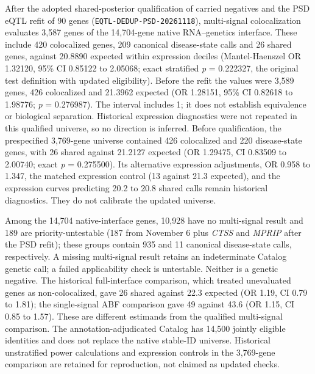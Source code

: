 After the adopted shared-posterior qualification of carried negatives and the PSD eQTL refit of 90 genes (\texttt{EQTL-DEDUP-PSD-20261118}), multi-signal colocalization evaluates 3,587 genes of the 14,704-gene native RNA--genetics interface. These include 420 colocalized genes, 209 canonical disease-state calls and 26 shared genes, against 20.8890 expected within expression deciles (Mantel-Haenszel OR 1.32120, 95\% CI 0.85122 to 2.05068; exact stratified \emph{p} = 0.222327, the original test definition with updated eligibility). Before the refit the values were 3,589 genes, 426 colocalized and 21.3962 expected (OR 1.28151, 95\% CI 0.82618 to 1.98776; \emph{p} = 0.276987). The interval includes 1; it does not establish equivalence or biological separation. Historical expression diagnostics were not repeated in this qualified universe, so no direction is inferred. Before qualification, the prespecified 3,769-gene universe contained 426 colocalized and 220 disease-state genes, with 26 shared against 21.2127 expected (OR 1.29475, CI 0.83509 to 2.00740; exact \emph{p} = 0.275500). Its alternative expression adjustments, OR 0.958 to 1.347, the matched expression control (13 against 21.3 expected), and the expression curves predicting 20.2 to 20.8 shared calls remain historical diagnostics. They do not calibrate the updated universe.

Among the 14,704 native-interface genes, 10,928 have no multi-signal result and 189 are priority-untestable (187 from November 6 plus \emph{CTSS} and \emph{MPRIP} after the PSD refit); these groups contain 935 and 11 canonical disease-state calls, respectively. A missing multi-signal result retains an indeterminate Catalog genetic call; a failed applicability check is untestable. Neither is a genetic negative. The historical full-interface comparison, which treated unevaluated genes as non-colocalized, gave 26 shared against 22.3 expected (OR 1.19, CI 0.79 to 1.81); the single-signal ABF comparison gave 49 against 43.6 (OR 1.15, CI 0.85 to 1.57). These are different estimands from the qualified multi-signal comparison. The annotation-adjudicated Catalog has 14,500 jointly eligible identities and does not replace the native stable-ID universe. Historical unstratified power calculations and expression controls in the 3,769-gene comparison are retained for reproduction, not claimed as updated checks.

